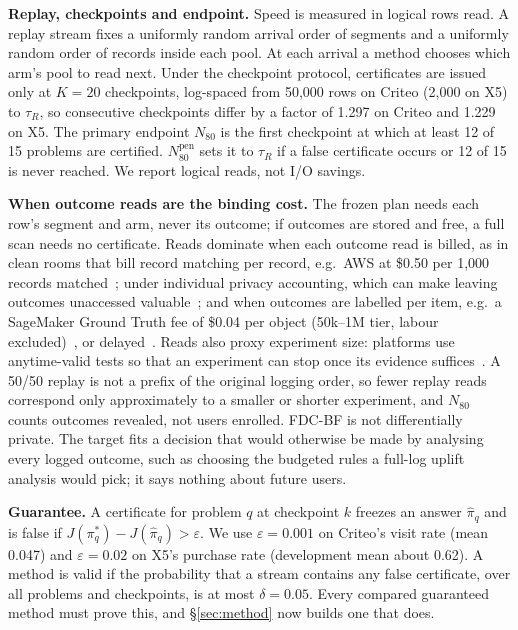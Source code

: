 \documentclass[sigconf,anonymous,review]{acmart}
\newcommand{\eps}{\varepsilon}
\newcommand{\Npen}{N_{80}^{\text{pen}}}
\begin{document}
\textbf{Replay, checkpoints and endpoint.} Speed is measured in logical rows read. A replay stream fixes a uniformly random arrival order of segments and a uniformly random order of records inside each pool. At each arrival a method chooses which arm's pool to read next. Under the checkpoint protocol, certificates are issued only at $K = 20$ checkpoints, log-spaced from 50,000 rows on Criteo (2,000 on X5) to $\tau_R$, so consecutive checkpoints differ by a factor of 1.297 on Criteo and 1.229 on X5. The primary endpoint $N_{80}$ is the first checkpoint at which at least 12 of 15 problems are certified. $\Npen$ sets it to $\tau_R$ if a false certificate occurs or 12 of 15 is never reached. We report logical reads, not I/O savings.

\textbf{When outcome reads are the binding cost.} The frozen plan needs each row's segment and arm, never its outcome; if outcomes are stored and free, a full scan needs no certificate. Reads dominate when each outcome read is billed, as in clean rooms that bill record matching per record, e.g.\ AWS at \$0.50 per 1,000 records matched~\citep{awscleanrooms2026pricing}; under individual privacy accounting, which can make leaving outcomes unaccessed valuable~\citep{ebadi2015personal,feldman2021individual}; and when outcomes are labelled per item, e.g.\ a SageMaker Ground Truth fee of \$0.04 per object (50k--1M tier, labour excluded)~\citep{awssagemaker2026pricing}, or delayed~\citep{chapelle2014modeling}. Reads also proxy experiment size: platforms use anytime-valid tests so that an experiment can stop once its evidence suffices~\citep{johari2017peeking,lindon2026anytime,schultzberg2023sequential}. A 50/50 replay is not a prefix of the original logging order, so fewer replay reads correspond only approximately to a smaller or shorter experiment, and $N_{80}$ counts outcomes revealed, not users enrolled. FDC-BF is not differentially private. The target fits a decision that would otherwise be made by analysing every logged outcome, such as choosing the budgeted rules a full-log uplift analysis would pick; it says nothing about future users.

\textbf{Guarantee.} A certificate for problem $q$ at checkpoint $k$ freezes an answer $\hat\pi_q$ and is false if $J(\pi^*_q) - J(\hat\pi_q) > \eps$. We use $\eps = 0.001$ on Criteo's visit rate (mean 0.047) and $\eps = 0.02$ on X5's purchase rate (development mean about 0.62). A method is valid if the probability that a stream contains any false certificate, over all problems and checkpoints, is at most $\delta = 0.05$. Every compared guaranteed method must prove this, and \S\ref{sec:method} now builds one that does.
\end{document}
